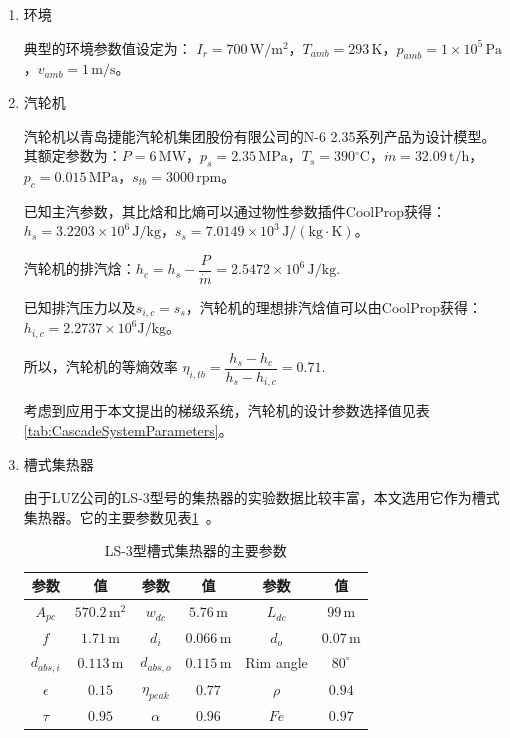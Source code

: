 \begin{enumerate}[label=(\arabic*)]

\item 环境

\setlength\parindent{2em}典型的环境参数值设定为：
$I_r = 700\,\mathrm{W/m^2}$，$T_{amb} = 293\,\mathrm{K}$，$p_{amb} = 1\times10^5\,\mathrm{Pa}$，$v_{amb} = 1\,\mathrm{m/s}$。

\item 汽轮机

汽轮机以青岛捷能汽轮机集团股份有限公司的N-6 2.35系列产品为设计模型。其额定参数为：$P = 6\,\mathrm{MW}$，$p_s = 2.35\,\mathrm{MPa}$，$T_s = 390\mathrm{^\circ C}$，$\dot{m} = 32.09\,\mathrm{t/h}$，$p_c = 0.015\,\mathrm{MPa}$，$s_{tb} = 3000\,\mathrm{rpm}$。
	
	已知主汽参数，其比焓和比熵可以通过物性参数插件CoolProp获得：$h_s = 3.2203\times10^6\,\mathrm{J/kg}$，$s_s = 7.0149\times10^3\,\mathrm{J/(kg\cdot K)}$。
	
	汽轮机的排汽焓：$h_{c} = h_{s} - \dfrac{P}{\dot{m}} = 2.5472\times10^6\,\mathrm{J/kg}$.
	
	已知排汽压力以及$s_{i,c} = s_s$，汽轮机的理想排汽焓值可以由CoolProp获得：$h_{i,c} = 2.2737\times10^6\mathrm{J/kg}$。
	
	所以，汽轮机的等熵效率
	$\eta_{i,tb} = \dfrac{h_s - h_c}{h_{s} - h_{i,c}} = 0.71$.
	
	考虑到应用于本文提出的梯级系统，汽轮机的设计参数选择值见表\ref{tab:CascadeSystemParameters}。
		 
\item 槽式集热器

由于LUZ公司的LS-3型号的集热器的实验数据比较丰富，本文选用它作为槽式集热器。它的主要参数见表\ref{tab:TroughParameters}~\cite{Fernandez2010}。

\begin{table}[htbp]
\setlength{\abovecaptionskip}{-10pt}
	\caption{LS-3型槽式集热器的主要参数}
	\begin{center}
	\begin{tabular}{cccccc}
		\toprule
		参数		&	值	&	参数		&	值	&	参数		&	值\\
		\midrule
		$A_{pc}$		&	$570.2\,\mathrm{m^2}$	&	$w_{dc}$	&	$5.76\,\mathrm{m}$	&	$L_{dc}$	&	$99\,\mathrm{m}$\\
		$f$	&	$1.71\,\mathrm{m}$	&	$d_i$		&	$0.066\,\mathrm{m}$	&	$d_o$	&	$0.07\,\mathrm{m}$\\
		$d_{abs,i}$	&	$0.113\,\mathrm{m}$	&	$d_{abs,o}$	&	$0.115\,\mathrm{m}$	&	Rim angle	&	$80^\circ$\\
		$\epsilon$		&	$0.15$	&	$\eta_{peak}$	&	$0.77$	&	$\rho$	&	$0.94$\\
		$\tau$	&	$0.95$	&	
$\alpha$	&	$0.96$	&	$Fe$	&	$0.97$\\
		\bottomrule
	\end{tabular}
	\end{center}
	\label{tab:TroughParameters}
\end{table}


\end{enumerate}
